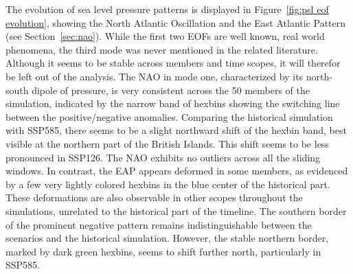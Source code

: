 The evolution of sea level pressure patterns is displayed in Figure~\ref{fig:psl eof evolution}, showing the North Atlantic Oscillation  and the East Atlantic Pattern (see Section~\ref{sec:nao}). 
While the first two EOFs are well known, real world phenomena, the third mode was never mentioned in the related literature. 
Although it seems to be stable across members and time scopes, it will therefor be left out of the analysis. 
The NAO in mode one, characterized by its north-south dipole of pressure, is very consistent across the 50 members of the simulation, indicated by the narrow band of hexbins showing the switching line between the positive/negative anomalies. 
Comparing the historical simulation with SSP585, there seems to be a slight northward shift of the hexbin band, best visible at the northern part of the British Islands. 
This shift seems to be less pronounced in SSP126. 
The NAO exhibits no outliers across all the sliding windows. In contrast, the EAP appears deformed in some members, as evidenced by a few very lightly colored hexbins in the blue center of the historical part. These deformations are also observable in other scopes throughout the simulations, unrelated to the historical part of the timeline.
The southern border of the prominent negative pattern remains indistinguishable between the scenarios and the historical simulation. However, the stable northern border, marked by dark green hexbins, seems to shift further north, particularly in SSP585.



